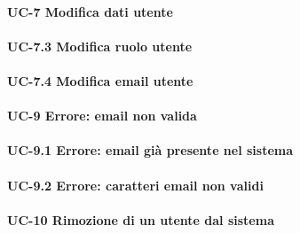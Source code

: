\paragraph{UC-7 Modifica dati utente}
    
    \paragraph{UC-7.3 Modifica ruolo utente}
    
    \paragraph{UC-7.4 Modifica email utente}


\paragraph{UC-9 Errore: email non valida}

    \paragraph{UC-9.1 Errore: email già presente nel sistema}

    \paragraph{UC-9.2 Errore: caratteri email non validi}

\paragraph{UC-10 Rimozione di un utente dal sistema}